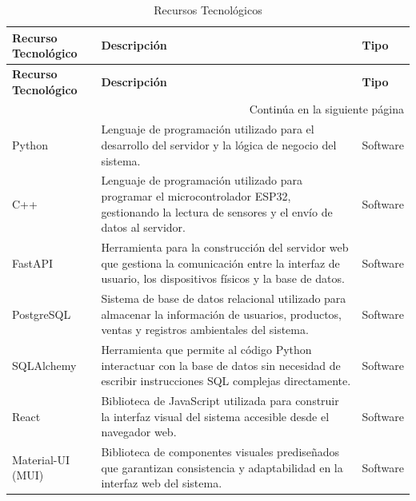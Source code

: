 \begin{longtable}{|p{3.5cm}|p{8cm}|p{2.5cm}|}

\caption{Recursos Tecnológicos} \label{tab:recursos_tecnologicos} \\

\hline
\rowcolor{gray!20}
\textbf{Recurso Tecnológico} & \textbf{Descripción} & \textbf{Tipo} \\
\hline
\endfirsthead

\hline
\rowcolor{gray!20}
\textbf{Recurso Tecnológico} & \textbf{Descripción} & \textbf{Tipo} \\
\hline
\endhead

\hline
\multicolumn{3}{|r|}{\small Continúa en la siguiente página} \\
\hline
\endfoot

\hline
\endlastfoot

Python &
Lenguaje de programación utilizado para el desarrollo del servidor y la lógica de negocio del sistema. &
Software \\
\hline

C++ &
Lenguaje de programación utilizado para programar el microcontrolador ESP32, gestionando la lectura de sensores y el envío de datos al servidor. &
Software \\
\hline

FastAPI &
Herramienta para la construcción del servidor web que gestiona la comunicación entre la interfaz de usuario, los dispositivos físicos y la base de datos. &
Software \\
\hline

PostgreSQL &
Sistema de base de datos relacional utilizado para almacenar la información de usuarios, productos, ventas y registros ambientales del sistema. &
Software \\
\hline

SQLAlchemy &
Herramienta que permite al código Python interactuar con la base de datos sin necesidad de escribir instrucciones SQL complejas directamente. &
Software \\
\hline

React &
Biblioteca de JavaScript utilizada para construir la interfaz visual del sistema accesible desde el navegador web. &
Software \\
\hline

Material-UI (MUI) &
Biblioteca de componentes visuales prediseñados que garantizan consistencia y adaptabilidad en la interfaz web del sistema. &
Software \\
\hline


\end{longtable}
